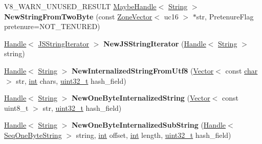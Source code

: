 \begin{DoxyCompactItemize}
V8\+\_\+\+W\+A\+R\+N\+\_\+\+U\+N\+U\+S\+E\+D\+\_\+\+R\+E\+S\+U\+LT \mbox{\hyperlink{classv8_1_1internal_1_1MaybeHandle}{Maybe\+Handle}}$<$ \mbox{\hyperlink{classv8_1_1internal_1_1String}{String}} $>$ {\bfseries New\+String\+From\+Two\+Byte} (const \mbox{\hyperlink{classv8_1_1internal_1_1ZoneVector}{Zone\+Vector}}$<$ uc16 $>$ $\ast$str, Pretenure\+Flag pretenure=N\+O\+T\+\_\+\+T\+E\+N\+U\+R\+ED)
\item 
\mbox{\label{classv8_1_1internal_1_1Factory_a6bef402f2ecfefc429c2aa54659c2d57}} 
\mbox{\hyperlink{classv8_1_1internal_1_1Handle}{Handle}}$<$ \mbox{\hyperlink{classv8_1_1internal_1_1JSStringIterator}{J\+S\+String\+Iterator}} $>$ {\bfseries New\+J\+S\+String\+Iterator} (\mbox{\hyperlink{classv8_1_1internal_1_1Handle}{Handle}}$<$ \mbox{\hyperlink{classv8_1_1internal_1_1String}{String}} $>$ string)
\item 
\mbox{\label{classv8_1_1internal_1_1Factory_a3ff0cb07282e6958ea0bc53da2b90540}} 
\mbox{\hyperlink{classv8_1_1internal_1_1Handle}{Handle}}$<$ \mbox{\hyperlink{classv8_1_1internal_1_1String}{String}} $>$ {\bfseries New\+Internalized\+String\+From\+Utf8} (\mbox{\hyperlink{classv8_1_1internal_1_1Vector}{Vector}}$<$ const \mbox{\hyperlink{classchar}{char}} $>$ str, \mbox{\hyperlink{classint}{int}} chars, \mbox{\hyperlink{classuint32__t}{uint32\+\_\+t}} hash\+\_\+field)
\item 
\mbox{\label{classv8_1_1internal_1_1Factory_ade72be82979623d4c8142463fcdfbbfa}} 
\mbox{\hyperlink{classv8_1_1internal_1_1Handle}{Handle}}$<$ \mbox{\hyperlink{classv8_1_1internal_1_1String}{String}} $>$ {\bfseries New\+One\+Byte\+Internalized\+String} (\mbox{\hyperlink{classv8_1_1internal_1_1Vector}{Vector}}$<$ const uint8\+\_\+t $>$ str, \mbox{\hyperlink{classuint32__t}{uint32\+\_\+t}} hash\+\_\+field)
\item 
\mbox{\label{classv8_1_1internal_1_1Factory_a41aca67ed554668d4cf0de2df6acc33c}} 
\mbox{\hyperlink{classv8_1_1internal_1_1Handle}{Handle}}$<$ \mbox{\hyperlink{classv8_1_1internal_1_1String}{String}} $>$ {\bfseries New\+One\+Byte\+Internalized\+Sub\+String} (\mbox{\hyperlink{classv8_1_1internal_1_1Handle}{Handle}}$<$ \mbox{\hyperlink{classv8_1_1internal_1_1SeqOneByteString}{Seq\+One\+Byte\+String}} $>$ string, \mbox{\hyperlink{classint}{int}} offset, \mbox{\hyperlink{classint}{int}} length, \mbox{\hyperlink{classuint32__t}{uint32\+\_\+t}} hash\+\_\+field)

\end{DoxyCompactItemize}
